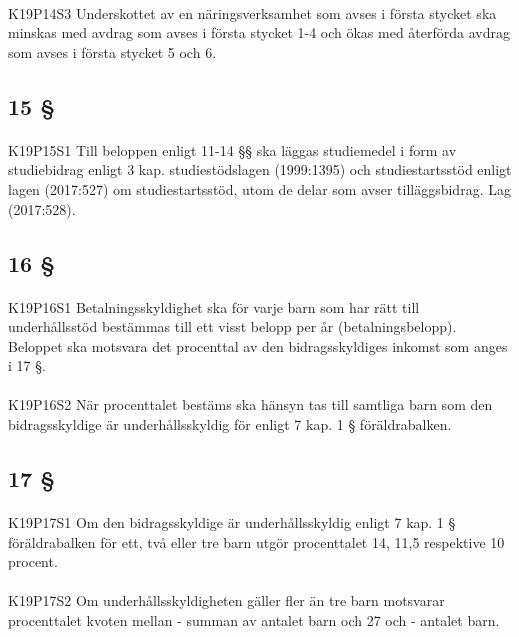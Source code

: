 \documentclass[a4paper,notitlepage,openany,10pt]{book}
\begin{document}
\paragraph*{}
{\tiny K19P14S3}
Underskottet av en näringsverksamhet som avses i första stycket ska minskas med avdrag som avses i första stycket 1-4 och ökas med återförda avdrag som avses i första stycket 5 och 6.
\subsection*{15 §}
\paragraph*{}
{\tiny K19P15S1}
Till beloppen enligt 11-14 §§ ska läggas studiemedel i form av studiebidrag enligt 3 kap. studiestödslagen (1999:1395) och studiestartsstöd enligt lagen (2017:527) om studiestartsstöd, utom de delar som avser tilläggsbidrag.
Lag (2017:528).
\subsection*{16 §}
\paragraph*{}
{\tiny K19P16S1}
Betalningsskyldighet ska för varje barn som har rätt till underhållsstöd bestämmas till ett visst belopp per år (betalningsbelopp). Beloppet ska motsvara det procenttal av den bidragsskyldiges inkomst som anges i 17 §.
\paragraph*{}
{\tiny K19P16S2}
När procenttalet bestäms ska hänsyn tas till samtliga barn som den bidragsskyldige är underhållsskyldig för enligt 7 kap. 1 § föräldrabalken.
\subsection*{17 §}
\paragraph*{}
{\tiny K19P17S1}
Om den bidragsskyldige är underhållsskyldig enligt 7 kap. 1 § föräldrabalken för ett, två eller tre barn utgör procenttalet 14, 11,5 respektive 10 procent.
\paragraph*{}
{\tiny K19P17S2}
Om underhållsskyldigheten gäller fler än tre barn motsvarar procenttalet kvoten mellan
\newline - summan av antalet barn och 27 och
\newline - antalet barn.
\end{document}
